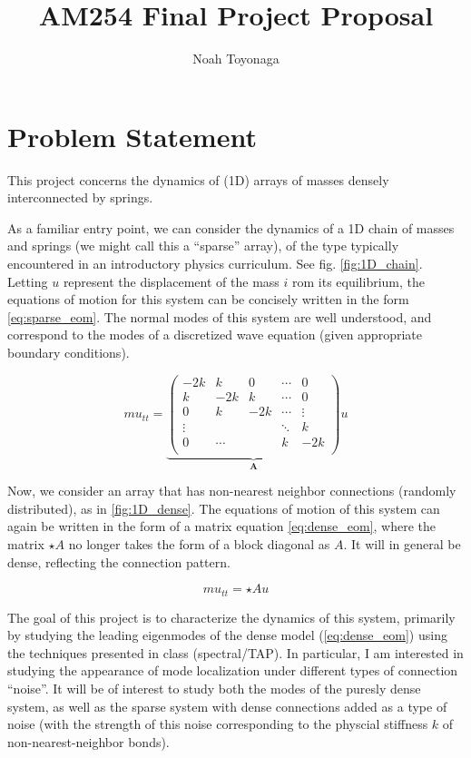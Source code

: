 \documentclass{article}
\title{AM254 Final Project Proposal}
\author{Noah Toyonaga}
\begin{document}
\maketitle
\tableofcontents

\section{Problem Statement}

This project concerns the dynamics of (1D) arrays of masses densely interconnected by springs. 

As a familiar entry point, we can consider the dynamics of a 1D chain of masses and springs (we might call this a ``sparse'' array), of the type typically encountered in an introductory physics curriculum. 
See  fig. \ref{fig:1D_chain}.
Letting  $u$ represent the displacement of the mass $i$ rom its equilibrium, 
the equations of motion for this system can be concisely written in the form \ref{eq:sparse_eom}. 
The normal modes of this system are well understood, and correspond to the modes of a discretized wave equation (given appropriate boundary conditions).

\begin{equation}
	\label{eq:sparse_eom}
	m u_{tt} = \underbrace{
		\begin{pmatrix}
			-2k & k & 0 &\cdots & 0 \\
			k & -2k & k & \cdots & 0 \\
			0 & k & -2k & \cdots & \vdots \\
			\vdots &&& \ddots & k \\
			0 & \cdots & & k & -2k \\
		\end{pmatrix}
	}_{\textbf{A}}u
\end{equation}


Now, we consider an array that has non-nearest neighbor connections (randomly distributed), as in \ref{fig:1D_dense}.
The equations of motion of this system can again be written in the form of a matrix equation \ref{eq:dense_eom},
where the matrix $\star{A}$ no longer takes the form of a block diagonal as $A$.
It will in general be dense, reflecting the connection pattern.

\begin{equation}
	\label{eq:dense_eom}
	m u_{tt}  = \star{A}u
\end{equation}

The goal of this project is to characterize the dynamics of this system, primarily by studying the 
leading eigenmodes of the dense model (\ref{eq:dense_eom}) using the techniques presented in class (spectral/TAP).
In particular, I am interested in studying the appearance of mode localization under different types of connection ``noise''.
It will be of interest to study both the modes of the puresly dense system, 
as well as the sparse system with dense connections added as a type of noise 
(with the strength of this noise corresponding to the physcial stiffness $k$ of non-nearest-neighbor bonds).
\end{document}
